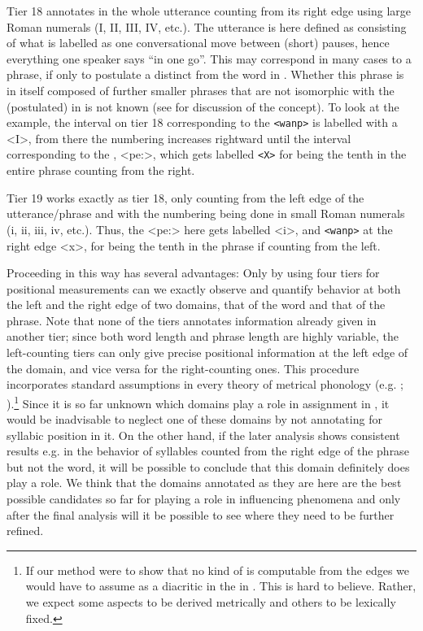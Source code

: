 \documentclass[output=paper]{LSP/langsci}
\begin{document}
Tier 18 annotates  in the whole utterance counting from its right edge using large Roman numerals (I, II, III, IV, etc.). The utterance is here defined as consisting of what is labelled as one conversational move between (short) pauses, hence everything one speaker says “in one go”. This may correspond in many cases to a  phrase, if only to postulate a  distinct from the word in . Whether this phrase is in itself composed of further smaller phrases that are not isomorphic with the (postulated)  in  is not known (see \citealt{Grice2000} for discussion of the concept). To look at the example, the interval on tier 18 corresponding to the  \texttt{<wanp>} is labelled with a <I>, from there the numbering increases rightward until the interval corresponding to the , <pe\textipa:>, which gets labelled \texttt{<X>} for being the tenth  in the entire phrase counting from the right. 

Tier 19 works exactly as tier 18, only counting from the left edge of the utterance/phrase and with the numbering being done in small Roman numerals (i, ii, iii, iv, etc.). Thus, the  <pe\textipa:> here gets labelled <i>, and \texttt{<wanp>} at the right edge <x>, for being the tenth  in the phrase if counting from the left. 

Proceeding in this way has several advantages: Only by using four tiers for positional measurements can we exactly observe and quantify  behavior at both the left and the right edge of two domains, that of the word and that of the phrase. Note that none of the tiers annotates information already given in another tier; since both word length and phrase length are highly variable, the left-counting tiers can only give precise positional information at the left edge of the domain, and vice versa for the right-counting ones. This procedure incorporates standard assumptions in every theory of metrical phonology (e.g. \citealt{Liberman1977,Hayes1995}; \citealt{Hulst1999}).\footnote{If our method were to show that no kind of  is computable from the edges we would have to assume  as a diacritic in the  in . This is hard to believe. Rather, we expect some aspects to be derived metrically and others to be lexically fixed.} Since it is so far unknown which  domains play a role in  assignment in , it would be inadvisable to neglect one of these domains by not annotating for syllabic position in it. On the other hand, if the later analysis shows consistent results e.g. in the  behavior of syllables counted from the right edge of the phrase but not the word, it will be possible to conclude that this domain definitely does play a role. We think that the domains annotated as they are here are the best possible candidates so far for playing a role in influencing  phenomena and only after the final analysis will it be possible to see where they need to be further refined.  
\end{document}
